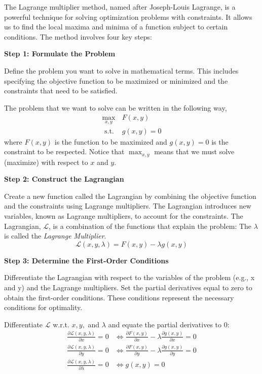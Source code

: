 \documentclass[
  12pt,
  oneside]{book}
\theoremstyle{definition}
\theoremstyle{definition}
\theoremstyle{definition}
\theoremstyle{definition}
\theoremstyle{remark}
\begin{document}
The Lagrange multiplier method, named after Joseph-Louis Lagrange,
is a powerful technique for solving optimization problems with constraints.
It allows us to find the local maxima and minima of a function subject to certain conditions.
The method involves four key steps:

\textbf{Step 1: Formulate the Problem}

Define the problem you want to solve in mathematical terms.
This includes specifying the objective function to be maximized or minimized and the constraints that need to be satisfied.

The problem that we want to solve can be written in the following way,
\[
\begin{array}{ll}
    \max _{x, y} & F(x, y) \\
    \text{ s.t. } & g(x, y)=0
\end{array}
\]
where \(F(x, y)\) is the function to be maximized and \(g(x, y)=0\) is the constraint to be respected.
Notice that \(\max _{x, y}\) means that we must solve (maximize) with respect to \(x\) and \(y\).

\textbf{Step 2: Construct the Lagrangian}

Create a new function called the Lagrangian by combining the objective function
and the constraints using Lagrange multipliers. The Lagrangian introduces new variables,
known as Lagrange multipliers, to account for the constraints.
The Lagrangian, \(\mathcal{L}\), is a combination of the functions that explain the problem:
The \(\lambda\) is called the \emph{Lagrange Multiplier}.
\[
\mathcal{L}(x, y, \lambda)=F(x, y)-\lambda g(x, y)
\]

\textbf{Step 3: Determine the First-Order Conditions}

Differentiate the Lagrangian with respect to the variables of the problem (e.g., x and y)
and the Lagrange multipliers. Set the partial derivatives equal to zero to obtain
the first-order conditions. These conditions represent the necessary conditions for optimality.

Differentiate \(\mathcal{L}\) w.r.t. \(x, y,\) and \(\lambda\) and equate the partial derivatives to 0:
\begin{align*}
    \frac{\partial \mathcal{L}(x, y, \lambda)}{\partial x}=0 & \Leftrightarrow \frac{\partial F(x, y)}{\partial x}-\lambda \frac{\partial g(x, y)}{\partial x}=0 \\
    \frac{\partial \mathcal{L}(x, y, \lambda)}{\partial y}=0 & \Leftrightarrow \frac{\partial F(x, y)}{\partial y}-\lambda \frac{\partial g(x, y)}{\partial y}=0 \\
    \frac{\partial \mathcal{L}(x, y, \lambda)}{\partial \lambda}=0 & \Leftrightarrow g(x, y)=0
\end{align*}
\end{document}
